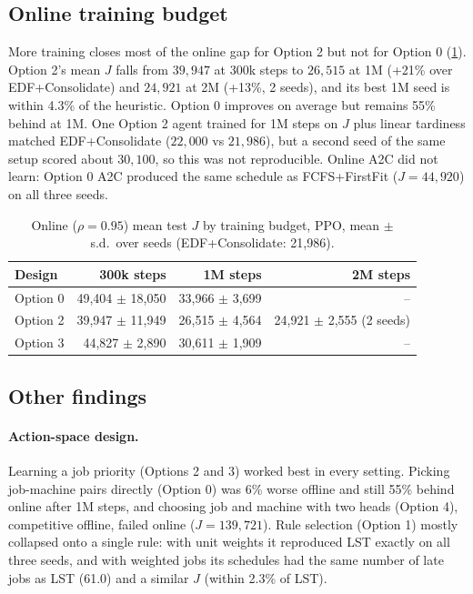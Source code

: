 \documentclass[12pt]{article}
\begin{document}
\subsection{Online training budget}\label{sec:res-online}
More training closes most of the online gap for Option 2 but not for Option 0 (\cref{tab:budget}). Option 2's mean $J$ falls from $39{,}947$ at 300k steps to $26{,}515$ at 1M (+21\% over EDF+Consolidate) and $24{,}921$ at 2M (+13\%, 2 seeds), and its best 1M seed is within 4.3\% of the heuristic. Option 0 improves on average but remains 55\% behind at 1M. One Option 2 agent trained for 1M steps on $J$ plus linear tardiness matched EDF+Consolidate ($22{,}000$ vs $21{,}986$), but a second seed of the same setup scored about $30{,}100$, so this was not reproducible. Online A2C did not learn: Option 0 A2C produced the same schedule as FCFS+FirstFit ($J = 44{,}920$) on all three seeds.

\begin{table}[htbp]
\centering
\caption{Online ($\rho = 0.95$) mean test $J$ by training budget, PPO, mean $\pm$ s.d.\ over seeds (EDF+Consolidate: 21,986).}
\label{tab:budget}
\begin{tabular}{lrrr}
\toprule
Design & 300k steps & 1M steps & 2M steps \\
\midrule
Option 0 & 49,404 $\pm$ 18,050 & 33,966 $\pm$ 3,699 & -- \\
Option 2 & 39,947 $\pm$ 11,949 & 26,515 $\pm$ 4,564 & 24,921 $\pm$ 2,555 (2 seeds) \\
Option 3 & 44,827 $\pm$ 2,890 & 30,611 $\pm$ 1,909 & -- \\
\bottomrule
\end{tabular}
\end{table}

\subsection{Other findings}\label{sec:res-other}
\paragraph{Action-space design.} Learning a job priority (Options 2 and 3) worked best in every setting. Picking job-machine pairs directly (Option 0) was 6\% worse offline and still 55\% behind online after 1M steps, and choosing job and machine with two heads (Option 4), competitive offline, failed online ($J = 139{,}721$). Rule selection (Option 1) mostly collapsed onto a single rule: with unit weights it reproduced LST exactly on all three seeds, and with weighted jobs its schedules had the same number of late jobs as LST (61.0) and a similar $J$ (within 2.3\% of LST).
\end{document}
